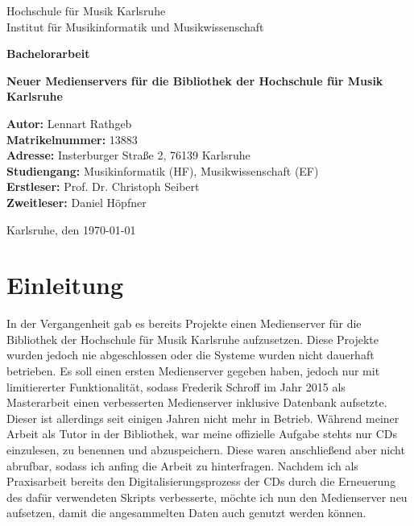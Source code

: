\documentclass[12pt,a4paper]{report}
\begin{document}
\begin{titlepage}
    \centering
    {\Large Hochschule für Musik Karlsruhe \\[1em]}
    {\large Institut für Musikinformatik und Musikwissenschaft \\[6em]}

    {\Large \textbf{Bachelorarbeit} \\[2em]}

    {\LARGE \textbf{Neuer Medienservers für die Bibliothek der Hochschule für Musik Karlsruhe} \\[6em]}

    \begin{minipage}{0.9\textwidth}
        \raggedright
        \textbf{Autor:} Lennart Rathgeb \\
        \textbf{Matrikelnummer:} 13883 \\
        \textbf{Adresse:} Insterburger Straße 2, 76139 Karlsruhe \\
        \textbf{Studiengang:} Musikinformatik (HF), Musikwissenschaft (EF) \\
        \textbf{Erstleser:} Prof. Dr. Christoph Seibert \\
        \textbf{Zweitleser:} Daniel Höpfner \\
    \end{minipage}

    \vfill
    Karlsruhe, den \today
\end{titlepage}

\cleardoublepage
{}
\tableofcontents

\cleardoublepage
\listoffigures
{}
\listoftables
{}

\cleardoublepage
{}
\setcounter{page}{1}
\chapter*{Einleitung}
\setcounter{section}{0}
\renewcommand\thesection{\arabic{section}}

In der Vergangenheit gab es bereits Projekte einen Medienserver für die Bibliothek der Hochschule für Musik Karlsruhe aufzusetzen. 
Diese Projekte wurden jedoch nie abgeschlossen oder die Systeme wurden nicht dauerhaft betrieben.
Es soll einen ersten Medienserver gegeben haben, jedoch nur mit limitiererter Funktionalität, 
sodass Frederik Schroff im Jahr 2015 als Masterarbeit einen verbesserten Medienserver inklusive Datenbank aufsetzte.
Dieser ist allerdings seit einigen Jahren nicht mehr in Betrieb.
Während meiner Arbeit als Tutor in der Bibliothek, war meine offizielle Aufgabe stehts nur CDs einzulesen, zu benennen und abzuspeichern.
Diese waren anschließend aber nicht abrufbar, sodass ich anfing die Arbeit zu hinterfragen.
Nachdem ich als Praxisarbeit bereits den Digitalisierungsprozess der CDs durch die Erneuerung des dafür verwendeten Skripts verbesserte, 
möchte ich nun den Medienserver neu aufsetzen, damit die angesammelten Daten auch genutzt werden können.
\end{document}
